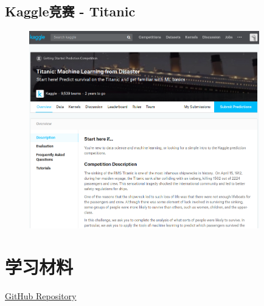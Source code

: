 \documentclass{beamer}
\begin{document}
    \subsection{Kaggle竞赛 - Titanic}
    \begin{frame}
        \begin{figure}
            \begin{center}
            \includegraphics[width=10cm]{imgs/kaggle-titanic.png}
            \end{center}
        \end{figure}
    \end{frame}

\section{学习材料}
    \begin{frame}
        \href{https://github.com/ShuaiHuang/Machine-Learning-Material}{GitHub Repository}
    \end{frame}
\end{document}
